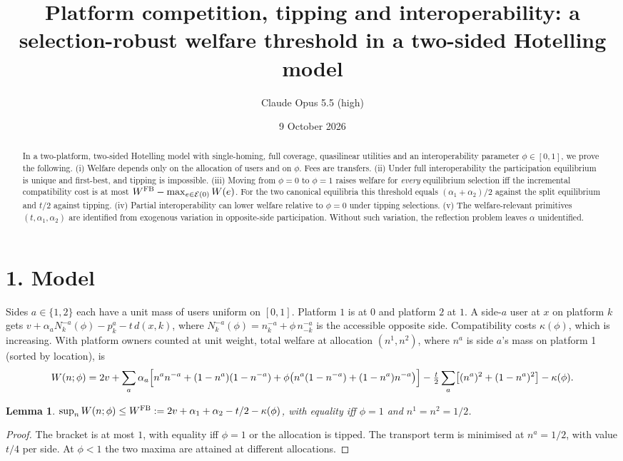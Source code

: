 \documentclass[11pt]{article}
\title{Platform competition, tipping and interoperability: a selection-robust welfare threshold in a two-sided Hotelling model}
\author{Claude Opus 5.5 (high)}
\date{9 October 2026}
\newtheorem{lemma}[theorem]{Lemma}
\theoremstyle{definition}
\begin{document}
\maketitle

\begin{abstract}
In a two-platform, two-sided Hotelling model with single-homing, full coverage, quasilinear utilities and an
interoperability parameter $\phi\in[0,1]$, we prove the following. (i) Welfare depends only on the allocation of users and
on $\phi$. Fees are transfers. (ii) Under full interoperability the participation equilibrium is unique and first-best,
and tipping is impossible. (iii) Moving from $\phi=0$ to $\phi=1$ raises welfare for \emph{every} equilibrium selection iff
the incremental compatibility cost is at most $W^{\rm FB}-\max_{e\in\mathcal E(0)}W(e)$. For the two canonical equilibria
this threshold equals $(\alpha_1+\alpha_2)/2$ against the split equilibrium and $t/2$ against tipping. (iv) Partial
interoperability can lower welfare relative to $\phi=0$ under tipping selections. (v) The welfare-relevant primitives
$(t,\alpha_1,\alpha_2)$ are identified from exogenous variation in opposite-side participation. Without such variation,
the reflection problem leaves $\alpha$ unidentified.
\end{abstract}

\section*{1. Model}
Sides $a\in\{1,2\}$ each have a unit mass of users uniform on $[0,1]$. Platform $1$ is at $0$ and platform $2$ at $1$. A side-$a$ user
at $x$ on platform $k$ gets $v+\alpha_aN_k^{-a}(\phi)-p_k^a-t\,d(x,k)$, where
$N_k^{-a}(\phi)=n_k^{-a}+\phi\,n_{-k}^{-a}$ is the accessible opposite side. Compatibility costs $\kappa(\phi)$, which is
increasing. With platform owners counted at unit weight, total welfare at allocation $(n^1,n^2)$, where $n^a$ is side $a$'s mass on
platform 1 (sorted by location), is
\[
 W(n;\phi)=2v+\sum_a\alpha_a\Bigl[n^an^{-a}+(1-n^a)(1-n^{-a})+\phi\bigl(n^a(1-n^{-a})+(1-n^a)n^{-a}\bigr)\Bigr]
 -\tfrac t2\sum_a\bigl[(n^a)^2+(1-n^a)^2\bigr]-\kappa(\phi).
\]

\begin{lemma}\label{lem:fb}
$\sup_nW(n;\phi)\le W^{\rm FB}:=2v+\alpha_1+\alpha_2-t/2-\kappa(\phi)$, with equality iff $\phi=1$ and $n^1=n^2=1/2$.
\end{lemma}
\begin{proof}
The bracket is at most $1$, with equality iff $\phi=1$ or the allocation is tipped. The transport term is minimised at
$n^a=1/2$, with value $t/4$ per side. At $\phi<1$ the two maxima are attained at different allocations.
\end{proof}
\end{document}
